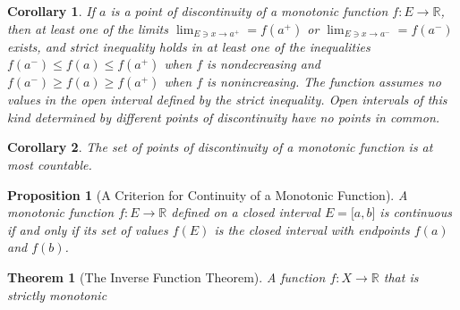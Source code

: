\documentclass[onecolumn]{ctexart}
\newtheorem{theorem}{Theorem}
\newtheorem{proposition}{Proposition}
\newtheorem{corollary}{Corollary}
\begin{document}
\begin{corollary}
  If $a$ is a point of discontinuity of a monotonic function $f:E \to \mathbb{R}$, 
  then at least one of the limits $\lim_{E \owns x \to a^+} = f(a^+)$ or 
  $\lim_{E \owns x \to a^-} = f(a^-)$ exists, and strict inequality holds in at 
  least one of the inequalities $f(a^-) \leq f(a) \leq f(a^+)$ when $f$ is 
  nondecreasing and $f(a^-) \geq f(a) \geq f(a^+)$ when $f$ is nonincreasing. 
  The function assumes no values in the open interval defined by the strict 
  inequality. Open intervals of this kind determined by different points of 
  discontinuity have no points in common.
\end{corollary}

\begin{corollary}
  The set of points of discontinuity of a monotonic function is at most 
  countable.
\end{corollary}

\begin{proposition}[A Criterion for Continuity of a Monotonic Function]
  A monotonic function $f:E \to \mathbb{R}$ defined on a closed interval 
  $E = \lbrack a,b \rbrack$ is continuous if and only if its set of values 
  $f(E)$ is the closed interval with endpoints $f(a)$ and $f(b)$.
\end{proposition}

\begin{theorem}[The Inverse Function Theorem]
  A function $f:X \to \mathbb{R}$ that is strictly monotonic
\end{theorem}
\end{document}
